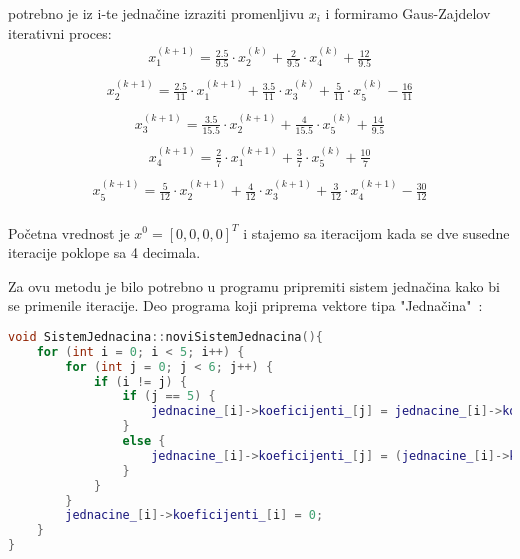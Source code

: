 \documentclass[12pt,leqno,a4paper]{article}
\begin{document}
potrebno je iz i-te jedna\v cine izraziti promenljivu $x_i$ i formiramo Gaus-Zajdelov iterativni proces:
\begin{equation*}
  \begin{aligned}
   x_{1}^{(k+1)}= \frac{2.5}{9.5} \cdot x_{2}^{(k)} + \frac{2}{9.5} \cdot x_{4}^{(k)}+ \frac{12}{9.5} \\
    \end{aligned}
\end{equation*}
\begin{equation*}
  \begin{aligned}
   x_{2}^{(k+1)}= \frac{2.5}{11} \cdot x_{1}^{(k+1)} + \frac{3.5}{11} \cdot x_{3}^{(k)} + \frac{5}{11} \cdot x_{5}^{(k)} - \frac{16}{11} \\
    \end{aligned}
\end{equation*}
\begin{equation*}
  \begin{aligned}
   x_{3}^{(k+1)}= \frac{3.5}{15.5} \cdot x_{2}^{(k+1)} + \frac{4}{15.5} \cdot x_{5}^{(k)}+ \frac{14}{9.5}\\
    \end{aligned}
\end{equation*}
\begin{equation*}
  \begin{aligned}
   x_{4}^{(k+1)}= \frac{2}{7} \cdot x_{1}^{(k+1)} + \frac{3}{7} \cdot x_{5}^{(k)}+ \frac{10}{7} \\
    \end{aligned}
\end{equation*}
\begin{equation*}
  \begin{aligned}
   x_{5}^{(k+1)}= \frac{5}{12} \cdot x_{2}^{(k+1)} + \frac{4}{12} \cdot x_{3}^{(k+1)} + \frac{3}{12} \cdot x_{4}^{(k+1)} - \frac{30}{12} \\
 \end{aligned}
\end{equation*}

Po\v cetna vrednost je $x^{0}=[0,0,0,0]^{T}$ i stajemo sa iteracijom kada se dve susedne iteracije poklope sa 4 decimala.

Za ovu metodu je bilo potrebno u programu pripremiti sistem jedna\v cina kako bi se primenile iteracije. Deo programa koji priprema vektore tipa "Jedna\v cina"\ :



\begin{lstlisting}[language=C++ ]
void SistemJednacina::noviSistemJednacina(){
	for (int i = 0; i < 5; i++) {
		for (int j = 0; j < 6; j++) {
			if (i != j) {
				if (j == 5) {
					jednacine_[i]->koeficijenti_[j] = jednacine_[i]->koeficijenti_[j] / jednacine_[i]->koeficijenti_[i];
				}
				else {
					jednacine_[i]->koeficijenti_[j] = (jednacine_[i]->koeficijenti_[j] / jednacine_[i]->koeficijenti_[i])*(-1);
				}
			}			
		}
		jednacine_[i]->koeficijenti_[i] = 0;
	}
}
\end{lstlisting}
\end{document}
